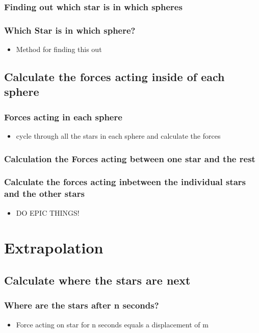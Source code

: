 \documentclass[aspectratio=169]{beamer}
\begin{document}
  \subsubsection{Finding out which star is in which spheres}

  \begin{frame}
    \frametitle{Which Star is in which sphere?}

    \begin{itemize}
      \item Method for finding this out
    \end{itemize}

  \end{frame}

  \subsection{Calculate the forces acting inside of each sphere}

  \begin{frame}
    \frametitle{Forces acting in each sphere}

    \begin{itemize}
      \item cycle through all the stars in each sphere and calculate the forces
    \end{itemize}
  \end{frame}

  \subsubsection{Calculation the Forces acting between one star and the rest}

  \begin{frame}
    \frametitle{Calculate the forces acting inbetween the individual stars
    and the other stars}

    \begin{itemize}
      \item DO EPIC THINGS!
    \end{itemize}
  \end{frame}

  \section{Extrapolation}
  \subsection{Calculate where the stars are next}

  \begin{frame}
    \frametitle{Where are the stars after n seconds?}

    \begin{itemize}
      \item Force acting on star for n seconds equals a displacement of m
    \end{itemize}
  \end{frame}
\end{document}
